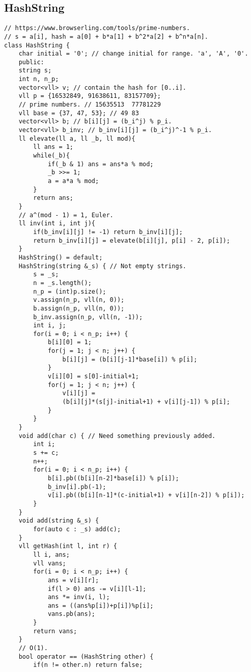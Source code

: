 \documentclass[a4paper]{article}
\begin{document}
\subsection*{HashString}
\begin{multicols}{2}
\begin{verbatim}
// https://www.browserling.com/tools/prime-numbers.
// s = a[i], hash = a[0] + b*a[1] + b^2*a[2] + b^n*a[n].
class HashString {
    char initial = '0'; // change initial for range. 'a', 'A', '0'.
    public:
    string s;
    int n, n_p;
    vector<vll> v; // contain the hash for [0..i].
    vll p = {16532849, 91638611, 83157709}; 
    // prime numbers. // 15635513  77781229
    vll base = {37, 47, 53}; // 49 83
    vector<vll> b; // b[i][j] = (b_i^j) % p_i.
    vector<vll> b_inv; // b_inv[i][j] = (b_i^j)^-1 % p_i. 
    ll elevate(ll a, ll _b, ll mod){
        ll ans = 1;
        while(_b){
            if(_b & 1) ans = ans*a % mod;
            _b >>= 1;
            a = a*a % mod;
        }
        return ans;
    }
    // a^(mod - 1) = 1, Euler.
    ll inv(int i, int j){
        if(b_inv[i][j] != -1) return b_inv[i][j];
        return b_inv[i][j] = elevate(b[i][j], p[i] - 2, p[i]);
    }
    HashString() = default;
    HashString(string &_s) { // Not empty strings.
        s = _s;
        n = _s.length();
        n_p = (int)p.size();
        v.assign(n_p, vll(n, 0));
        b.assign(n_p, vll(n, 0));
        b_inv.assign(n_p, vll(n, -1));
        int i, j;
        for(i = 0; i < n_p; i++) {
            b[i][0] = 1;
            for(j = 1; j < n; j++) {
                b[i][j] = (b[i][j-1]*base[i]) % p[i];
            }
            v[i][0] = s[0]-initial+1;
            for(j = 1; j < n; j++) {
                v[i][j] = 
                (b[i][j]*(s[j]-initial+1) + v[i][j-1]) % p[i];
            }
        }
    }
    void add(char c) { // Need something previously added.
        int i;
        s += c;
        n++;
        for(i = 0; i < n_p; i++) {
            b[i].pb((b[i][n-2]*base[i]) % p[i]);
            b_inv[i].pb(-1);
            v[i].pb((b[i][n-1]*(c-initial+1) + v[i][n-2]) % p[i]);
        }
    }
    void add(string &_s) {
        for(auto c : _s) add(c);
    }
    vll getHash(int l, int r) {
        ll i, ans;
        vll vans;
        for(i = 0; i < n_p; i++) {
            ans = v[i][r];
            if(l > 0) ans -= v[i][l-1];
            ans *= inv(i, l);
            ans = ((ans%p[i])+p[i])%p[i];
            vans.pb(ans);
        }
        return vans;
    }
    // O(1).
    bool operator == (HashString other) {
        if(n != other.n) return false;

\end{verbatim}
\end{multicols}
\end{document}
